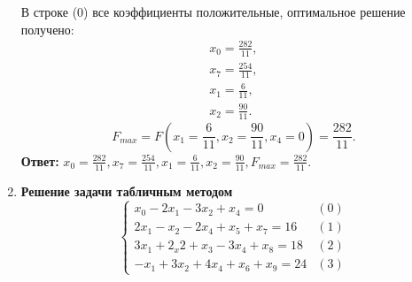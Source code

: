 \documentclass[a4paper,12pt]{article}
\begin{document}
\begin{flushleft}
\begin{enumerate}
    В строке (0) все коэффициенты положительные, оптимальное решение получено:
    \begin{equation*}
      \begin{split}
        x_0 = \frac{282}{11}, \\
        x_7 = \frac{254}{11}, \\
        x_1 = \frac{6}{11}, \\
        x_2 = \frac{90}{11}.
      \end{split}
    \end{equation*}
    \begin{equation*}
      F_{max} = F(x_1 = \frac{6}{11}, x_2 = \frac{90}{11}, x_4 = 0) = \frac{282}{11}.
    \end{equation*}
    \textbf{Ответ:} $x_0 = \frac{282}{11}, x_7 = \frac{254}{11}, x_1 = \frac{6}{11}, x_2 = \frac{90}{11}, F_{max} = \frac{282}{11}.$
  \item \textbf{Решение задачи табличным методом}
    \begin{equation*}
      \begin{cases}
        x_0 - 2x_1 - 3x_2 + x_4 = 0 & (0)\\
        2x_1 - x_2 - 2x_4 + x_5 + x_7 = 16 & (1) \\
        3x_1 + 2_x2 + x_3 - 3x_4 + x_8 = 18 & (2) \\
        -x_1 + 3x_2 + 4x_4 + x_6 + x_9 = 24 & (3)
      \end{cases}
    \end{equation*}


\end{enumerate}
\end{flushleft}
\end{document}
